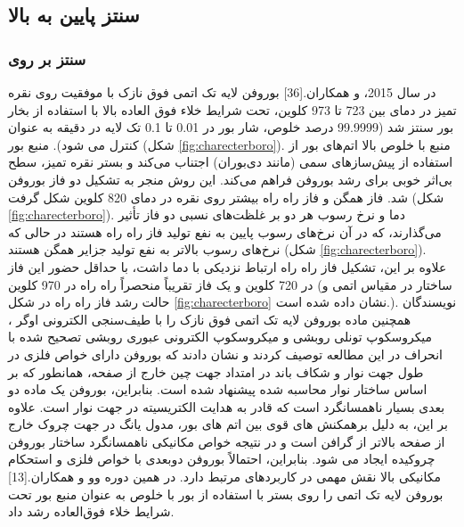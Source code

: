 \subsection{سنتز پایین به بالا}
\subsubsection{سنتز بر روی  }
در سال 2015،  و همکاران.\cite{mannixSynthesisBorophenesAnisotropic2015}[36] بوروفن لایه تک اتمی فوق نازک با موفقیت روی نقره تمیز در دمای بین 723 تا 973 کلوین، تحت شرایط خلاء فوق العاده بالا با استفاده از بخار بور سنتز شد (99.9999 درصد خلوص، شار بور در 0.01 تا 0.1 تک لایه در دقیقه به عنوان \lr{[$ML min^{-1}]$} کنترل می شود). منبع بور (شکل \ref{fig:charecterboro}). منبع با خلوص بالا اتم‌های بور از استفاده از پیش‌سازهای سمی (مانند دی‌بوران) اجتناب می‌کند و بستر نقره تمیز، سطح بی‌اثر خوبی برای رشد بوروفن فراهم می‌کند. این روش منجر به تشکیل دو فاز بوروفن شد. فاز همگن و فاز راه راه بیشتر روی نقره در دمای 820 کلوین شکل گرفت (شکل \ref{fig:charecterboro}). دما و نرخ رسوب هر دو بر غلظت‌های نسبی دو فاز تأثیر می‌گذارند، که در آن نرخ‌های رسوب پایین به نفع تولید فاز راه راه هستند در حالی که نرخ‌های رسوب بالاتر به نفع تولید جزایر همگن هستند (شکل \ref{fig:charecterboro}). علاوه بر این، تشکیل فاز راه راه ارتباط نزدیکی با دما داشت، با حداقل حضور این فاز در 720 کلوین و یک فاز تقریباً منحصراً راه راه در 970 کلوین (ساختار در مقیاس اتمی و حالت رشد فاز راه راه در شکل \ref{fig:charecterboro} نشان داده شده است.). نویسندگان همچنین ماده بوروفن لایه تک اتمی فوق نازک را با طیف‌سنجی الکترونی اوگر ، میکروسکوپ تونلی روبشی  و میکروسکوپ الکترونی عبوری روبشی تصحیح شده با انحراف  در این مطالعه توصیف کردند و نشان دادند که بوروفن دارای خواص فلزی در طول جهت نوار و شکاف باند در امتداد جهت چین خارج از صفحه، همانطور که بر اساس ساختار نوار محاسبه شده پیشنهاد شده است. بنابراین، بوروفن یک ماده دو بعدی بسیار ناهمسانگرد است که قادر به هدایت الکتریسیته در جهت نوار است. علاوه بر این، به دلیل برهمکنش های قوی بین اتم های بور، مدول یانگ در جهت چروک خارج از صفحه بالاتر از گرافن است و در نتیجه خواص مکانیکی ناهمسانگرد ساختار بوروفن چروکیده ایجاد می شود. بنابراین، احتمالاً بوروفن دوبعدی با خواص فلزی و استحکام مکانیکی بالا نقش مهمی در کاربردهای مرتبط دارد. در همین دوره وو و همکاران.\cite{fengDirectEvidenceMetallic2016}[13] بوروفن لایه تک اتمی را روی بستر  با استفاده از بور با خلوص  به عنوان منبع بور تحت شرایط خلاء فوق‌العاده رشد داد.

